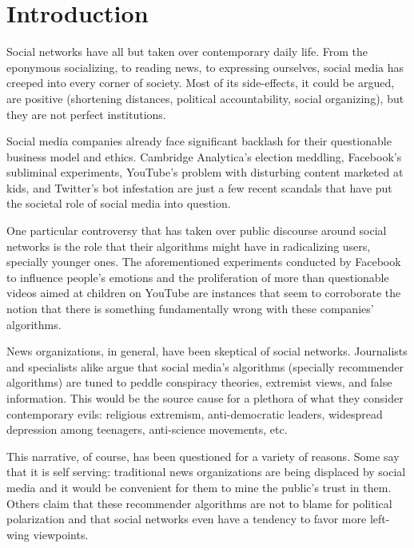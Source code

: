 
\chapter{Introduction}
\label{cap:introduction}

Social networks have all but taken over contemporary daily life. From the
eponymous socializing, to reading news, to expressing ourselves, social media
has creeped into every corner of society. Most of its side-effects, it could be
argued, are positive (shortening distances, political accountability, social
organizing), but they are not perfect institutions.

Social media companies already face significant backlash for their questionable
business model and ethics. Cambridge Analytica's election meddling, Facebook's
subliminal experiments, YouTube's problem with disturbing content marketed at
kids, and Twitter's bot infestation are just a few recent scandals that have put
the societal role of social media into question.

One particular controversy that has taken over public discourse around social
networks is the role that their algorithms might have in radicalizing users,
specially younger ones. The aforementioned experiments conducted by Facebook to
influence people's emotions and the proliferation of more than questionable
videos aimed at children on YouTube are instances that seem to corroborate the
notion that there is something fundamentally wrong with these companies'
algorithms.

News organizations, in general, have been skeptical of social networks.
Journalists and specialists alike argue that social media's algorithms
(specially recommender algorithms) are tuned to peddle conspiracy theories,
extremist views, and false information. This would be the source cause for a
plethora of what they consider contemporary evils: religious extremism,
anti-democratic leaders, widespread depression among teenagers, anti-science
movements, etc.

This narrative, of course, has been questioned for a variety of reasons. Some
say that it is self serving: traditional news organizations are being displaced
by social media and it would be convenient for them to mine the public's trust
in them. Others claim that these recommender algorithms are not to blame for
political polarization and that social networks even have a tendency to favor
more left-wing viewpoints.

